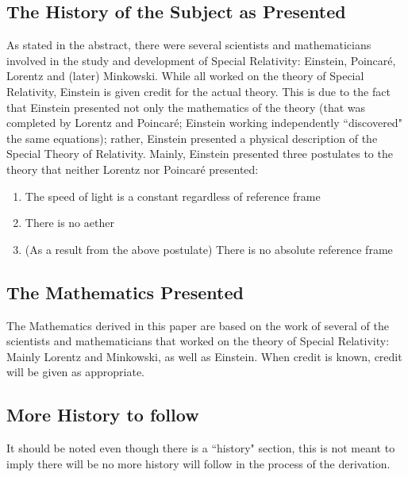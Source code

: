 \documentclass[journal]{IEEEtran}
\begin{document}
\subsection{The History of the Subject as Presented}
As stated in the abstract, there were several scientists and
mathematicians involved in the study and development of Special
Relativity:  Einstein, Poincar\'e, Lorentz and (later) Minkowski.
While all worked on the theory of Special Relativity, Einstein is
given credit for the actual theory.  This is due to the fact that
Einstein presented not only the mathematics of the theory (that was
completed by Lorentz and Poincar\'e; Einstein working
independently ``discovered" the same equations); rather, Einstein
presented a physical description of the Special Theory of Relativity.
Mainly, Einstein presented three postulates to the theory that neither
Lorentz nor Poincar\'e presented:
\begin{enumerate}
\item The speed of light is a constant regardless of reference frame
\item There is no aether
\item (As a result from the above postulate) There is no absolute
reference frame
\end{enumerate}
\subsection{The Mathematics Presented}
The Mathematics derived in this paper are based on the work of
several of the scientists and mathematicians that worked on the theory
of Special Relativity:  Mainly Lorentz and Minkowski, as well as
Einstein.  When credit is known, credit will be given as appropriate.
\subsection{More History to follow}
It should be noted even though there is a ``history" section, this is
not meant to imply there will be no more history will follow in the
process of the derivation.
\end{document}
